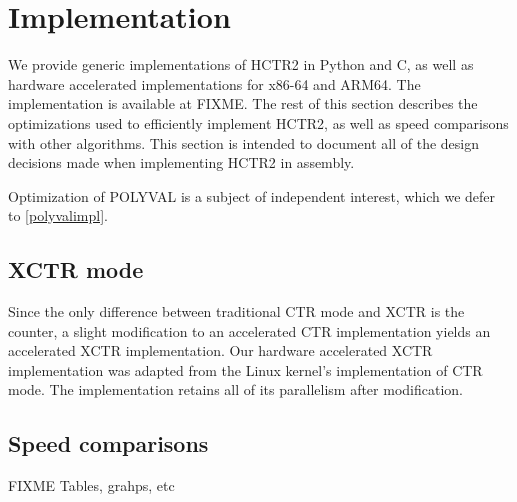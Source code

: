 \documentclass[hctr2.tex]{subfiles}
\begin{document}
\section{Implementation}\label{implementation}
We provide generic implementations of HCTR2 in Python and C, as well as hardware accelerated implementations for x86-64 and ARM64. The implementation is available at {\color{red} FIXME}. The rest of this section describes the optimizations used to efficiently implement HCTR2, as well as speed comparisons with other algorithms. This section is intended to document all of the design decisions made when implementing HCTR2 in assembly.

Optimization of POLYVAL is a subject of independent
interest, which we defer to \autoref{polyvalimpl}.

\subsection{XCTR mode}
Since the only difference between traditional CTR mode and XCTR is the counter, a slight modification to an accelerated CTR implementation yields an accelerated XCTR implementation. Our hardware accelerated XCTR implementation was adapted from the Linux kernel's implementation of CTR mode. The implementation retains all of its parallelism after modification. 

\subsection{Speed comparisons}
{\color{red} FIXME Tables, grahps, etc}
\end{document}
